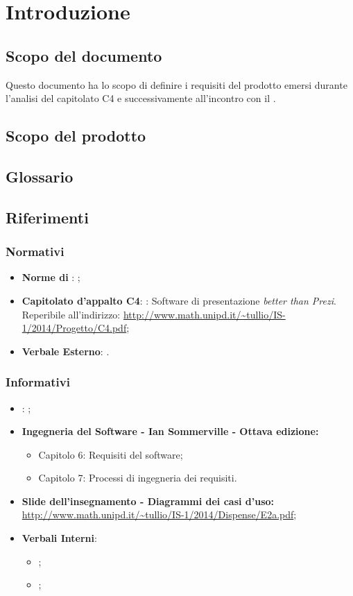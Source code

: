 \section{Introduzione}
\subsection{Scopo del documento}
Questo documento ha lo scopo di definire i requisiti del prodotto emersi durante l'analisi del capitolato C4 e successivamente all'incontro con il \proponente.
\subsection{Scopo del prodotto}\label{scopoProdotto}
\scopoProdotto
\subsection{Glossario}
\descrizioneGlossario
\subsection{Riferimenti}
\subsubsection{Normativi}
\begin{itemize}
\item \textbf{Norme di }: \normeDiProgetto;
\item \textbf{Capitolato d'appalto C4}: \progetto: Software di presentazione \textit{better than Prezi}. Reperibile all'indirizzo: \url{http://www.math.unipd.it/~tullio/IS-1/2014/Progetto/C4.pdf};
\item \textbf{Verbale Esterno}: \eII.
\end{itemize}
\subsubsection{Informativi}
\begin{itemize}
\item \textbf{\SF}: \studioDiFattibilita;
\item \textbf{Ingegneria del Software - Ian Sommerville - Ottava edizione:}
\begin{itemize}
\item Capitolo 6: Requisiti del software;
\item Capitolo 7: Processi di ingegneria dei requisiti.
\end{itemize}
\item \textbf{Slide dell'insegnamento - Diagrammi dei casi d'uso:} \url{http://www.math.unipd.it/~tullio/IS-1/2014/Dispense/E2a.pdf};
\item \textbf{Verbali Interni}:
\begin{itemize}
\item \iI;
\item \iII;
\end{itemize}
\end{itemize}
